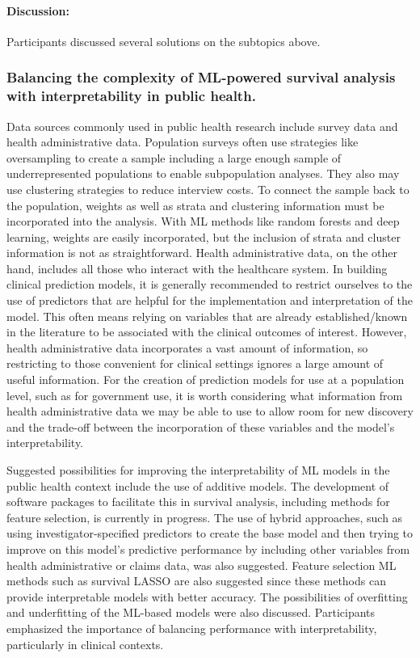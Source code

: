 \paragraph{Discussion:}
Participants discussed several solutions on the subtopics above.

\subsubsection{Balancing the complexity of ML-powered survival analysis with interpretability in public health.}
Data sources commonly used in public health research include survey data and health administrative data. Population surveys often use strategies like oversampling to create a sample including a large enough sample of underrepresented populations to enable subpopulation analyses. They also may use clustering strategies to reduce interview costs. To connect the sample back to the population, weights as well as strata and clustering information must be incorporated into the analysis. With ML methods like random forests and deep learning, weights are easily incorporated, but the inclusion of strata and cluster information is not as straightforward. 
Health administrative data, on the other hand, includes all those who interact with the healthcare system. In building clinical prediction models, it is generally recommended to restrict ourselves to the use of predictors that are helpful for the implementation and interpretation of the model. This often means relying on variables that are already established/known in the literature to be associated with the clinical outcomes of interest. However, health administrative data incorporates a vast amount of information, so restricting to those convenient for clinical settings ignores a large amount of useful information. For the creation of prediction models for use at a population level, such as for government use, it is worth considering what information from health administrative data we may be able to use to allow room for new discovery and the trade-off between the incorporation of these variables and the model’s interpretability.

Suggested possibilities for improving the interpretability of ML models in the public health context include the use of additive models. The development of software packages to facilitate this in survival analysis, including methods for feature selection, is currently in progress. The use of hybrid approaches, such as using investigator-specified predictors to create the base model and then trying to improve on this model’s predictive performance by including other variables from health administrative or claims data, was also suggested. Feature selection ML methods such as survival LASSO are also suggested since these methods can provide interpretable models with better accuracy. The possibilities of overfitting and underfitting of the ML-based models were also discussed. Participants emphasized the importance of balancing performance with interpretability, particularly in clinical contexts.

